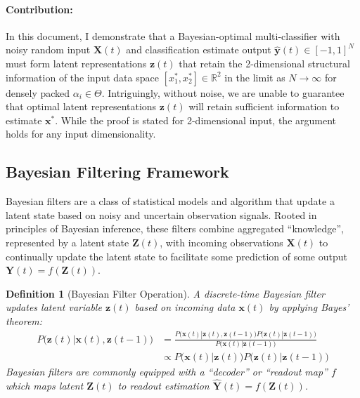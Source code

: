 \documentclass[12pt]{article}
\newtheorem{definition}{Definition}
\begin{document}
\paragraph{Contribution: } In this document, I demonstrate that a
Bayesian-optimal multi-classifier with noisy random input $\mathbf X(t)$ and
classification estimate output $\hat {\mathbf y}(t) \in [-1, 1]^N$ must form
latent representations $\mathbf z(t)$ that retain the 2-dimensional structural
information of the input data space $[x_1^*, x_2^*] \in \mathbb R^2$ in the
limit as $N\to \infty$ for densely packed $\alpha_i \in \Theta$. 
Intriguingly, without noise, we are unable to guarantee that optimal latent
representations $\mathbf z(t)$ will retain sufficient information to estimate
$\mathbf x^*$. 
While the proof is stated for 2-dimensional input, the argument holds for
any input dimensionality. 


\subsection{Bayesian Filtering Framework}

Bayesian filters are a class of statistical models and algorithm that update a
latent state based on noisy and uncertain observation signals. 
Rooted in principles of Bayesian inference, these filters combine aggregated 
``knowledge'', represented by a latent state $\mathbf Z(t)$, with incoming
observations $\mathbf X(t)$ to continually update the latent state to
facilitate some prediction of some output $\mathbf Y(t) = f(\mathbf Z(t))$. 


\begin{definition}[Bayesian Filter Operation]
	\label{def:bayesian_filter}
	A discrete-time Bayesian filter updates latent variable $\mathbf z(t)$
	based on incoming data $\mathbf x(t)$ by applying Bayes' theorem: 
	\begin{align}
		\label{eqn:bayes_filter}
		P \big(\mathbf z(t) | \mathbf  x(t), \mathbf z(t-1)\big) &= \frac{
			P\big(\mathbf x(t) | \mathbf z(t), \mathbf z(t-1)\big) 
			P\big(\mathbf z(t) | \mathbf z(t-1)\big)
		}{
			P\big(\mathbf x(t) | \mathbf z(t-1)\big)
		} \\
		&\propto P\big(\mathbf x(t) | \mathbf z(t) \big) 
			P\big(\mathbf z(t) | \mathbf z(t-1)\big)
	\end{align}
	Bayesian filters are commonly equipped with a ``decoder'' or ``readout
	map'' $f$ which maps latent $\mathbf Z(t)$ to readout estimation
	$\hat{\mathbf Y}(t) = f(\mathbf Z(t))$.
\end{definition}
\end{document}
